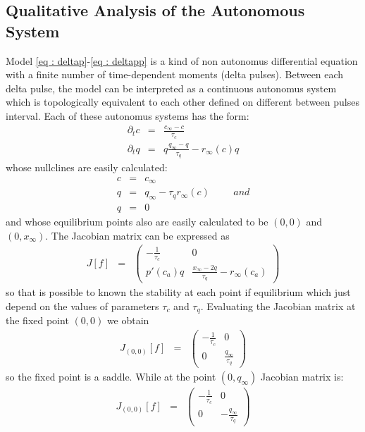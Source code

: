 \subsection{Qualitative Analysis of the Autonomous System}

Model \eqref{eq : deltap}-\eqref{eq : deltapp} is a kind of non autonomus differential equation with a finite number of time-dependent moments (delta pulses). Between each delta pulse, the model can be interpreted as a continuous autonomus system which is topologically equivalent to each other defined on different  between pulses  interval. Each of these autonomus systems has the form: 
\begin{eqnarray} 
\partial_t c &=& \frac{c_{\infty}-c}{\tau_c} \\
\partial_t q &=& q \frac{q_{\infty}-q}{\tau_q} - r_{\infty}(c) q 
\end{eqnarray}
whose nullclines are easily calculated:
\begin{eqnarray} 
c &=& c_{\infty}\\
q &=& q_{\infty}-\tau_q r_{\infty}(c) \hspace{1cm} and\\
q &=& 0
\end{eqnarray}
and whose equilibrium points also are easily calculated to be $(0,0)$ and  $(0,x_{\infty})$.
The Jacobian matrix can be expressed as 
\begin{eqnarray}
J[f] &=& \begin{pmatrix}-\frac{1}{\tau_c} & 0 \\
p'(c_a)q & \frac{x_{\infty}-2q}{\tau_q}-r_{\infty}(c_a)
\end{pmatrix}
\end{eqnarray}
so that is possible to known the stability at each point if equilibrium which just depend on the values of parameters  $\tau_c$ and $\tau_q$.
Evaluating the Jacobian matrix at the fixed point $(0,0)$ we obtain 
\begin{eqnarray}
J_{(0,0)}[f] &=& \begin{pmatrix}-\frac{1}{\tau_c} & 0 \\
0 & \frac{q_{\infty}}{\tau_q}
\end{pmatrix}
\end{eqnarray}
so the fixed point is a saddle. While at the point $(0,q_{\infty})$ Jacobian matrix is: 
\begin{eqnarray}
J_{(0,0)}[f] &=& \begin{pmatrix}-\frac{1}{\tau_c} & 0 \\
0 & -\frac{q_{\infty}}{\tau_q}
\end{pmatrix}
\end{eqnarray}
